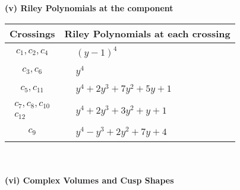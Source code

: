 \documentclass[1p]{elsarticle_modified}
\theoremstyle{definition}
\begin{document}
\newpage\renewcommand{\arraystretch}{1}
\flushleft \textbf{(v) Riley Polynomials at the component}\newline \\
\begin{tabular}{m{50pt}|m{274pt}}
Crossings & \hspace{64pt}Riley Polynomials at each crossing \\
\hline $$\begin{aligned}c_{1},c_{2},c_{4}\end{aligned}$$&$\begin{aligned}
&(y-1)^4
\end{aligned}$\\
\hline $$\begin{aligned}c_{3},c_{6}\end{aligned}$$&$\begin{aligned}
&y^4
\end{aligned}$\\
\hline $$\begin{aligned}c_{5},c_{11}\end{aligned}$$&$\begin{aligned}
&y^4+2 y^3+7 y^2+5 y+1
\end{aligned}$\\
\hline $$\begin{aligned}c_{7},c_{8},c_{10}\\c_{12}\end{aligned}$$&$\begin{aligned}
&y^4+2 y^3+3 y^2+y+1
\end{aligned}$\\
\hline $$\begin{aligned}c_{9}\end{aligned}$$&$\begin{aligned}
&y^4- y^3+2 y^2+7 y+4
\end{aligned}$\\
\hline
\end{tabular}\\~\\
\newpage\flushleft \textbf{(vi) Complex Volumes and Cusp Shapes}
\end{document}

